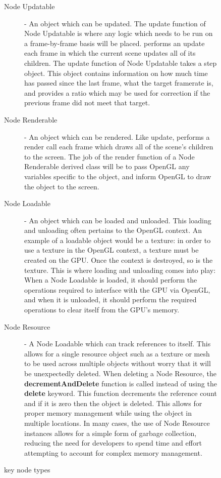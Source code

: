 \documentclass{GlobalDocument}
\begin{document}
\begin{figure}[htb]
\begin{description}
\item[Node Updatable]{- An object which can be updated. The update function of Node Updatable is where any logic which needs to be run on a frame-by-frame basis will be placed. \ourengine{} performs an update each frame in which the current scene updates all of its children. The update function of Node Updatable takes a step object. This object contains information on how much time has passed since the last frame, what the target framerate is, and provides a ratio which may be used for correction if the previous frame did not meet that target.}

\item[Node Renderable]{- An object which can be rendered. Like update, \ourengine{} performs a render call each frame which draws all of the scene's children to the screen. The job of the render function of a Node Renderable derived class will be to pass OpenGL any variables specific to the object, and inform OpenGL to draw the object to the screen.}

\item[Node Loadable]{- An object which can be loaded and unloaded. This loading and unloading often pertains to the OpenGL context. An example of a loadable object would be a texture: in order to use a texture in the OpenGL context, a texture must be created on the GPU. Once the context is destroyed, so is the texture. This is where loading and unloading comes into play: When a Node Loadable is loaded, it should perform the operations required to interface with the GPU via OpenGL, and when it is unloaded, it should perform the required operations to clear itself from the GPU's memory.}

\item[Node Resource]{- A Node Loadable which can track references to itself. This allows for a single resource object such as a texture or mesh to be used across multiple objects without worry that it will be unexpectedly deleted. When deleting a Node Resource, the \textbf{decrementAndDelete} function is called instead of using the \textbf{delete} keyword. This function decrements the reference count and if it is zero then the object is deleted. This allows for proper memory management while using the object in multiple locations. In many cases, the use of Node Resource instances allows for a simple form of garbage collection, reducing the need for developers to spend time and effort attempting to account for complex memory management.}
\end{description}
\caption{\ourengine{} key node types}
\label{fig:nodes}
\end{figure}
\end{document}
